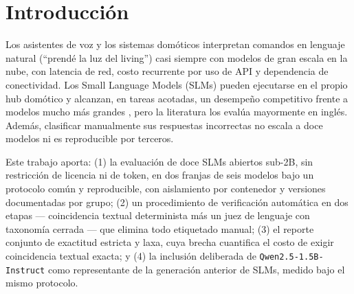 \section{Introducción}

Los asistentes de voz y los sistemas domóticos interpretan comandos en
lenguaje natural (``prendé la luz del living'') casi siempre con modelos de
gran escala en la nube, con latencia de red, costo recurrente por uso de API
y dependencia de conectividad. Los Small Language Models (SLMs) pueden
ejecutarse en el propio hub domótico y alcanzan, en tareas acotadas, un
desempeño competitivo frente a modelos mucho más grandes
\cite{gupta2025slms}, pero la literatura los evalúa mayormente en inglés.
Además, clasificar manualmente sus respuestas incorrectas no escala a doce
modelos ni es reproducible por terceros.

Este trabajo aporta: (1) la evaluación de doce SLMs abiertos sub-2B, sin
restricción de licencia ni de token, en dos franjas de seis modelos bajo un
protocolo común y reproducible, con aislamiento por contenedor y versiones
documentadas por grupo; (2) un procedimiento de verificación automática en
dos etapas — coincidencia textual determinista más un juez de lenguaje con
taxonomía cerrada — que elimina todo etiquetado manual; (3) el reporte
conjunto de exactitud estricta y laxa, cuya brecha cuantifica el costo de
exigir coincidencia textual exacta; y (4) la inclusión deliberada de
\texttt{Qwen2.5-1.5B-Instruct} como representante de la generación anterior
de SLMs, medido bajo el mismo protocolo.
